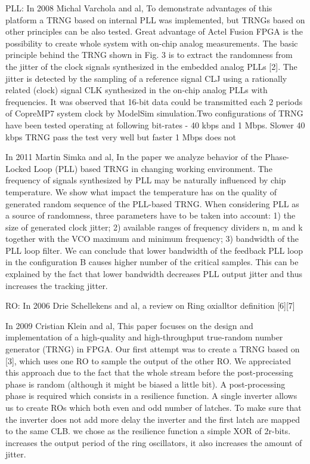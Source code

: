 PLL:
In 2008 Michal Varchola and al, To demonstrate advantages of this platform a TRNG based on internal PLL was implemented, but TRNGs based on other principles can be also tested. Great advantage of Actel Fusion FPGA is the possibility to create whole system with on-chip analog measurements. The basic principle behind the TRNG shown in Fig. 3 is to extract the randomness from the jitter of the clock signals synthesized in the embedded analog PLLs [2]. The jitter is detected by the sampling of a reference signal CLJ using a rationally related (clock) signal CLK synthesized in the on-chip analog PLLs with frequencies. It was observed that 16-bit data could be transmitted each 2 periods of CopreMP7 system clock by ModelSim simulation.Two configurations of TRNG have been tested operating at following bit-rates - 40 kbps and 1 Mbps. Slower 40 kbps TRNG pass the test very well but faster 1 Mbps does not

In 2011 Martin Simka and al, In the paper we analyze behavior of the Phase-Locked Loop (PLL) based TRNG in changing working environment. The frequency of signals synthesized by PLL may be naturally influenced by chip temperature. We show what impact the temperature has on the quality of generated random sequence of the PLL-based TRNG. When considering PLL as a source of randomness, three parameters have to be taken into account: 1) the size of generated clock jitter; 2) available ranges of frequency dividers n, m and k together with the VCO maximum and minimum frequency; 3) bandwidth of the PLL loop filter. We can conclude that lower bandwidth of the feedback PLL loop in the configuration B causes higher number of the critical samples. This can be explained by the fact that lower bandwidth decreases PLL output jitter and thus increases the tracking jitter. 

RO:
In 2006 Drie Schellekens and al, a review on Ring oxialltor definition [6][7]

In 2009 Cristian Klein and al, This paper focuses on the design and implementation of a high-quality and high-throughput true-random number generator (TRNG) in FPGA. Our first attempt was to create a TRNG based on [3], which uses one RO to sample the output of the other RO. We appreciated this approach due to the fact that the whole stream before the post-processing phase is random (although it might be biased a little bit). A post-processing phase is required which consists in a resilience function. A single inverter allows us to create ROs which both even and odd number of latches. To make sure that the inverter does not add more delay the inverter and the first latch are mapped to the same CLB. we chose as the resilience function a simple XOR of 2r-bits. increases the output period of the ring oscillators, it also increases the amount of jitter.

